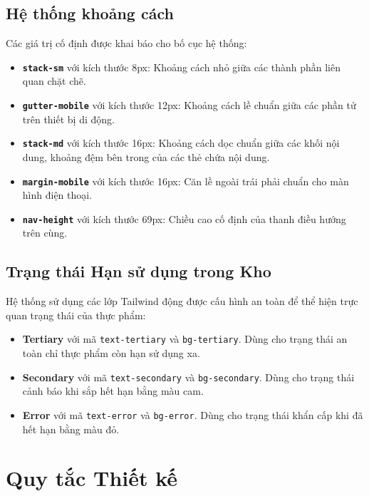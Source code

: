 \documentclass[12pt,a4paper]{article}
\newcommand{\code}[1]{\texttt{#1}}
\begin{document}
\subsection{Hệ thống khoảng cách}
Các giá trị cố định được khai báo cho bố cục hệ thống:
\begin{itemize}[leftmargin=*]
  \item \textbf{\code{stack-sm}} với kích thước 8px: Khoảng cách nhỏ giữa các thành phần liên quan chặt chẽ.
  \item \textbf{\code{gutter-mobile}} với kích thước 12px: Khoảng cách lề chuẩn giữa các phần tử trên thiết bị di động.
  \item \textbf{\code{stack-md}} với kích thước 16px: Khoảng cách dọc chuẩn giữa các khối nội dung, khoảng đệm bên trong của các thẻ chứa nội dung.
  \item \textbf{\code{margin-mobile}} với kích thước 16px: Căn lề ngoài trái phải chuẩn cho màn hình điện thoại.
  \item \textbf{\code{nav-height}} với kích thước 69px: Chiều cao cố định của thanh điều hướng trên cùng.
\end{itemize}

\subsection{Trạng thái Hạn sử dụng trong Kho}
Hệ thống sử dụng các lớp Tailwind động được cấu hình an toàn để thể hiện trực quan trạng thái của thực phẩm:
\begin{itemize}[leftmargin=*]
  \item \textbf{Tertiary} với mã \code{text-tertiary} và \code{bg-tertiary}. Dùng cho trạng thái an toàn chỉ thực phẩm còn hạn sử dụng xa.
  \item \textbf{Secondary} với mã \code{text-secondary} và \code{bg-secondary}. Dùng cho trạng thái cảnh báo khi sắp hết hạn bằng màu cam.
  \item \textbf{Error} với mã \code{text-error} và \code{bg-error}. Dùng cho trạng thái khẩn cấp khi đã hết hạn bằng màu đỏ.
\end{itemize}

\section{Quy tắc Thiết kế}
\end{document}
